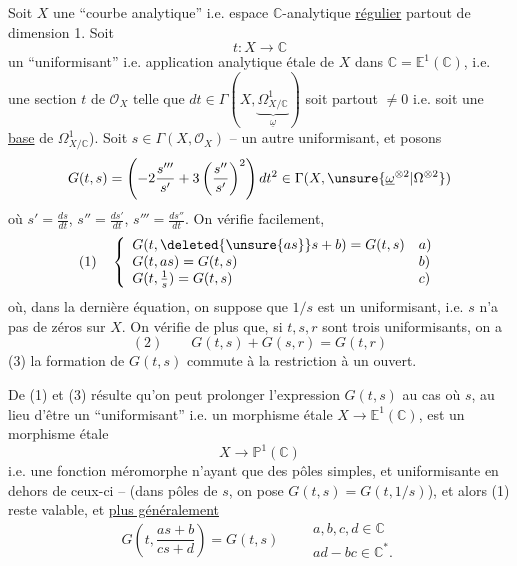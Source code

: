 Soit $X$ une ``courbe analytique'' i.e. espace $\mathbb C$-analytique \uline{régulier} partout de dimension 1. Soit
\[
t:X\longrightarrow\mathbb C
\]
un ``uniformisant'' i.e.  application analytique étale de $X$ dans $\mathbb C=\mathbb E^1(\mathbb C)$, i.e. une section $t$ de $\mathcal O_X$ telle que $dt\in\Gamma(X,\underbrace{\Omega^1_{X/\mathbb C}}_{\underline\omega})$ soit partout $\ne0$ i.e. soit une \uline{base} de $\Omega^1_{X/\mathbb C}$). Soit $s\in\Gamma(X,\mathcal O_X)$ --  un autre uniformisant, et posons
\[
G(t,s)=\left(-2\frac{s'''}{s'}+3\left(\frac{s''}{s'}\right)^2\right)dt^2\in\Gamma(X,\unsure{\underline\omega^{\otimes2}|\Omega^{\otimes2}})
\]
où $s'=\frac{ds}{dt}$, $s''=\frac{ds'}{dt}$, $s'''=\frac{ds''}{dt}$. On  vérifie facilement,  
\[
(1)\quad\left\{\begin{array}{ll}
G(t,\deleted{\unsure{as}}s+b)=G(t,s)&a)\\
G(t,as)=G(t,s)&b)\\
G(t,\frac1s)=G(t,s)&c)
\end{array}\right.
\]
où, dans la dernière équation, on suppose que $1/s$ est un uniformisant, i.e. $s$ n'a pas de zéros sur $X$. On vérifie de plus que, si $t,s,r$ sont trois uniformisants, on a
\[
(2)\qquad G(t,s)+G(s,r)=G(t,r)
\]
 (3) la formation de $G(t,s)$ commute à la restriction à un ouvert. 

De (1)  et (3) résulte qu'on peut prolonger l'expression $G(t,s)$ au cas où $s$, au lieu d'être un ``uniformisant'' i.e. un morphisme étale $X\longrightarrow\mathbb E^1(\mathbb C)$, est un morphisme étale
\[
X\longrightarrow\mathbb P^1(\mathbb C)
\]
i.e. une fonction méromorphe n'ayant que des pôles simples, et uniformisante en dehors de ceux-ci -- (dans  pôles de $s$, on pose $G(t,s)=G(t,1/s)$), et alors  (1)  reste valable, et \uline{plus généralement}
\[
G\left(t,\frac{as+b}{cs+d}\right)=G(t,s)\qquad
\begin{gathered}a,b,c,d\in\mathbb C\\ad-bc\in\mathbb C^*.\end{gathered}
\]

